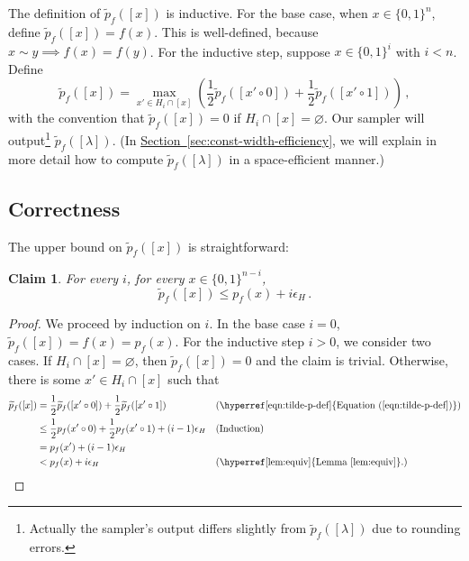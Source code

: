 \documentclass[10pt,a4paper]{article}
\newtheorem{claim}[theorem]{Claim}
\newcommand{\expref}[2]{\hyperref[#2]{#1~\ref*{#2}}}
\newcommand{\expeqref}[2]{\hyperref[#2]{#1~(\ref*{#2})}}
\begin{document}
The definition of $\widetilde{p}_f([x])$ is inductive. For the base case, when $x \in \{0, 1\}^n$, define $\widetilde{p}_f([x]) = f(x)$. This is well-defined, because $x \sim y \implies f(x) = f(y)$. For the inductive step, suppose $x \in \{0, 1\}^i$ with $i < n$. Define
\begin{equation} \label{eqn:tilde-p-def}
\widetilde{p}_f([x]) = \max_{x' \in H_i \cap [x]} \left(\frac{1}{2} \widetilde{p}_f([x' \circ 0]) + \frac{1}{2} \widetilde{p}_f([x' \circ 1])\right)\,,
\end{equation}
with the convention that $\widetilde{p}_f([x]) = 0$ if $H_i \cap [x] = \varnothing$. Our sampler will output\footnote{Actually the sampler's output differs slightly from $\widetilde{p}_f([\lambda])$ due to rounding errors.} $\widetilde{p}_f([\lambda])$. (In \expref{Section}{sec:const-width-efficiency}, we will explain in more detail how to compute $\widetilde{p}_f([\lambda])$ in a space-efficient manner.)

\subsection{Correctness}

The upper bound on $\widetilde{p}_f([x])$ is straightforward:
\begin{claim} \label{clm:const-width-ub}
For every $i$, for every $x \in \{0, 1\}^{n - i}$,
$$
\widetilde{p}_f([x]) \leq p_f(x) + i \epsilon_H\,.
$$
\end{claim}

\begin{proof}
We proceed by induction on $i$. In the base case $i = 0$, $\widetilde{p}_f([x]) = f(x) = p_f(x)$. For the inductive step $i > 0$, we consider two cases. If $H_i \cap [x] = \varnothing$, then $\widetilde{p}_f([x]) = 0$ and the claim is trivial. Otherwise, there is some $x' \in H_i \cap [x]$ such that
\begin{align*}
\widetilde{p}_f([x]) &= \frac{1}{2} \widetilde{p}_f([x' \circ 0]) + \frac{1}{2} \widetilde{p}_f([x' \circ 1]) && (\text{\expeqref{Equation}{eqn:tilde-p-def}}) \\
&\leq \frac{1}{2} p_f(x' \circ 0) + \frac{1}{2} p_f(x' \circ 1) + (i - 1) \epsilon_H && \text{(Induction)} \\
&= p_f(x') + (i - 1) \epsilon_H \\
&< p_f(x) + i \epsilon_H && \text{(\expref{Lemma}{lem:equiv}.)} \qedhere
\end{align*}
\end{proof}
\end{document}
